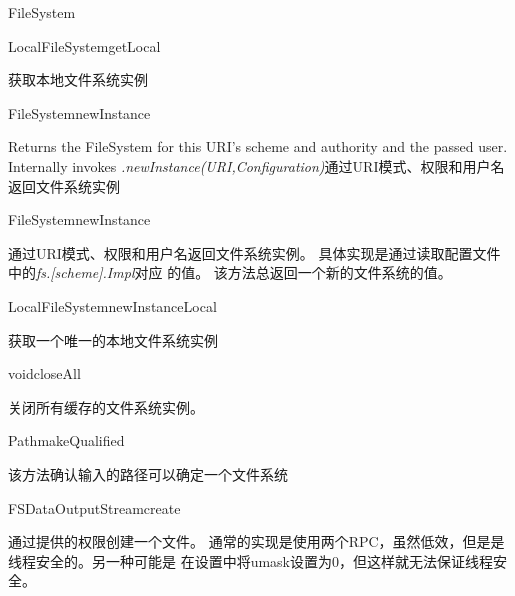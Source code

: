 \begin{XeClass}{FileSystem}
    \begin{XeMethod}{\XePublic}{LocalFileSystem}{getLocal}
         
 获取本地文件系统实例

    \end{XeMethod}

    \begin{XeMethod}{\XePublic}{FileSystem}{newInstance}
         
 Returns the FileSystem for this URI's scheme and authority and the
 passed user. Internally invokes \emph{.newInstance(URI,Configuration)}通过URI模式、权限和用户名返回文件系统实例

    \end{XeMethod}

    \begin{XeMethod}{\XePublic}{FileSystem}{newInstance}
         
 通过URI模式、权限和用户名返回文件系统实例。
 具体实现是通过读取配置文件中的\emph{fs.[scheme].Impl}对应
 的值。
 该方法总返回一个新的文件系统的值。

    \end{XeMethod}

    \begin{XeMethod}{\XePublic}{LocalFileSystem}{newInstanceLocal}
         
 获取一个唯一的本地文件系统实例

    \end{XeMethod}

    \begin{XeMethod}{\XePublic}{void}{closeAll}
         
 关闭所有缓存的文件系统实例。

    \end{XeMethod}

    \begin{XeMethod}{\XePublic}{Path}{makeQualified}
         
 该方法确认输入的路径可以确定一个文件系统

    \end{XeMethod}

    \begin{XeMethod}{\XePublic}{FSDataOutputStream}{create}
         
 通过提供的权限创建一个文件。
 通常的实现是使用两个RPC，虽然低效，但是是线程安全的。另一种可能是
 在设置中将umask设置为0，但这样就无法保证线程安全。

    \end{XeMethod}


\end{XeClass}
